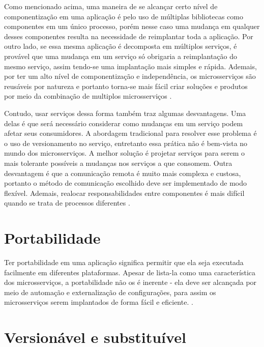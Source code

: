 Como mencionado acima, uma maneira de se alcançar certo nível de componentização em uma aplicação é pelo uso de múltiplas bibliotecas como componentes em um único processo, porém nesse caso uma mudança em qualquer desses componentes resulta na necessidade de reimplantar toda a aplicação. Por outro lado, se essa mesma aplicação é decomposta em múltiplos serviços, é provável que uma mudança em um serviço só obrigaria a reimplantação do mesmo serviço, assim tendo-se uma implantação mais simples e rápida. Ademais, por ter um alto nível de componentização e independência, os microsserviços são reusáveis por natureza e portanto torna-se mais fácil criar soluções e produtos por meio da combinação de multiplos microsserviços \cite{martin-fowler-microservices,Familiar2015}.

Contudo, usar serviços dessa forma também traz algumas desvantagens. Uma delas é que será necessário considerar como mudanças em um serviço podem afetar seus consumidores. A abordagem tradicional para resolver esse problema é o uso de versionamento no serviço, entretanto essa prática não é bem-vista no mundo dos microsserviços. A melhor solução é projetar serviços para serem o mais tolerante possíveis a mudanças nos serviços a que consomem. Outra desvantagem é que a comunicação remota é muito mais complexa e custosa, portanto o método de comunicação escolhido deve ser implementado de modo flexível. Ademais, realocar responsabilidades entre componentes é mais difícil quando se trata de processos diferentes \cite{martin-fowler-microservices}.

\section{Portabilidade} %

Ter portabilidade em uma aplicação significa permitir que ela seja executada facilmente em diferentes plataformas. Apesar de lista-la como uma característica dos microsserviços, a portabilidade não os é inerente - ela deve ser alcançada por meio de automação e externalização de configurações, para assim os microsserviços serem implantados de forma fácil e eficiente. \cite{Familiar2015}.

\section{Versionável e substituível}


